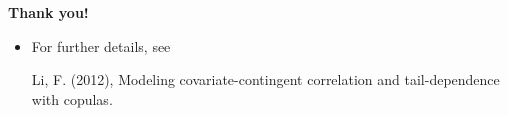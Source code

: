 \documentclass[14pt]{beamer}
\begin{document}
\begin{frame}[plain]
  \addtocounter{framenumber}{-1}
  \begin{center}
    {\color{SUblue} \textbf{\Huge Thank you!}}
  \end{center}

    \begin{itemize}

    \item [] For further details, see

      Li, F. (2012), Modeling covariate-contingent correlation and tail-dependence with copulas.
    \end{itemize}

\end{frame}
\end{document}
